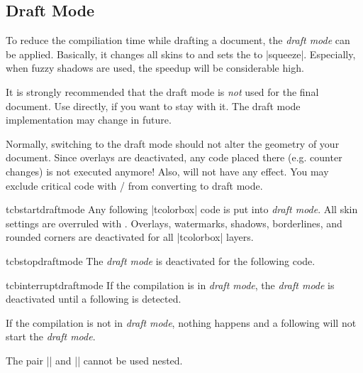 \clearpage
\subsection{Draft Mode}\label{subsec:draftmode}
To reduce the compiliation time while drafting a document, the \emph{draft mode}
can be applied. Basically, it changes all skins to  and
sets the  to |squeeze|. Especially,
when fuzzy shadows are used, the speedup will be considerable high.

\begin{marker}
It is strongly recommended that the draft mode is \emph{not} used for the final document.
Use  directly, if you want to stay with it. The draft mode
implementation may change in future.
\end{marker}

\begin{marker}
Normally, switching to the draft mode should not alter the geometry of
your document. Since overlays are deactivated, any code placed there
(e.g. counter changes) is not executed anymore! Also, 
will not have any effect. You may exclude critical code with
 / 
from converting to draft mode.
\end{marker}


\begin{docCommand}{tcbstartdraftmode}{}
  Any following |tcolorbox| code is put into \emph{draft mode}. All skin
  settings are overruled with . Overlays, watermarks,
  shadows, borderlines, and rounded corners are deactivated for all |tcolorbox|
  layers.
\end{docCommand}

\begin{docCommand}{tcbstopdraftmode}{}
  The \emph{draft mode} is deactivated for the following code.
\end{docCommand}

\begin{docCommand}{tcbinterruptdraftmode}{}
  If the compilation is in \emph{draft mode}, the \emph{draft mode} is deactivated
  until a following  is detected.\par
  If the compilation is not in \emph{draft mode}, nothing happens and a following
   will not start the \emph{draft mode}.
  \begin{marker}
  The pair |\tcbinterruptdraftmode| and |\tcbcontinuedraftmode| cannot
  be used nested.
  \end{marker}
\end{docCommand}

